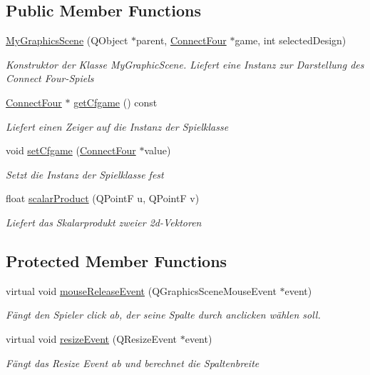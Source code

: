 \subsection*{Public Member Functions}
\begin{DoxyCompactItemize}
\item 
\hyperlink{class_my_graphics_scene_a0a9622d196f6ea758f119faddf37caac}{My\-Graphics\-Scene} (Q\-Object $\ast$parent, \hyperlink{class_connect_four}{Connect\-Four} $\ast$game, int selected\-Design)
\begin{DoxyCompactList}\small\item\em Konstruktor der Klasse My\-Graphic\-Scene. Liefert eine Instanz zur Darstellung des Connect Four-\/\-Spiels \end{DoxyCompactList}\item 
\hyperlink{class_connect_four}{Connect\-Four} $\ast$ \hyperlink{class_my_graphics_scene_a7883bc1ffdb2cf3834179de0d3f14843}{get\-Cfgame} () const 
\begin{DoxyCompactList}\small\item\em Liefert einen Zeiger auf die Instanz der Spielklasse \end{DoxyCompactList}\item 
void \hyperlink{class_my_graphics_scene_a89bb2786bb7a9a4c13a37ad1296ffaf0}{set\-Cfgame} (\hyperlink{class_connect_four}{Connect\-Four} $\ast$value)
\begin{DoxyCompactList}\small\item\em Setzt die Instanz der Spielklasse fest \end{DoxyCompactList}\item 
float \hyperlink{class_my_graphics_scene_ab2dc3b23ea848b5f081939d569b16774}{scalar\-Product} (Q\-Point\-F u, Q\-Point\-F v)
\begin{DoxyCompactList}\small\item\em Liefert das Skalarprodukt zweier 2d-\/\-Vektoren \end{DoxyCompactList}\end{DoxyCompactItemize}
\subsection*{Protected Member Functions}
\begin{DoxyCompactItemize}
\item 
virtual void \hyperlink{class_my_graphics_scene_a65a5dabb614e22ae4a4b48d9f2faffdc}{mouse\-Release\-Event} (Q\-Graphics\-Scene\-Mouse\-Event $\ast$event)
\begin{DoxyCompactList}\small\item\em Fängt den Spieler click ab, der seine Spalte durch anclicken wählen soll. \end{DoxyCompactList}\item 
virtual void \hyperlink{class_my_graphics_scene_a174dd0911afadc8f637a5ebf6f5b9b0c}{resize\-Event} (Q\-Resize\-Event $\ast$event)
\begin{DoxyCompactList}\small\item\em Fängt das Resize Event ab und berechnet die Spaltenbreite \end{DoxyCompactList}\end{DoxyCompactItemize}


